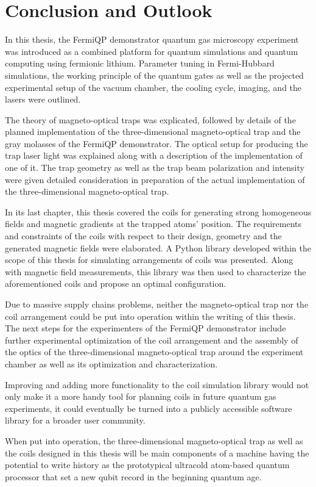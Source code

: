 \renewcommand{\imagepath}{../50-outro/img}

\chapter{Conclusion and Outlook}
In this thesis, the FermiQP demonstrator quantum gas microscopy experiment was introduced as a combined platform for quantum simulations and quantum computing using fermionic lithium. Parameter tuning in Fermi-Hubbard simulations, the working principle of the quantum gates as well as the projected experimental setup of the vacuum chamber, the cooling cycle, imaging, and the lasers were outlined.

The theory of magneto-optical traps was explicated, followed by details of the planned implementation of the three-dimensional magneto-optical trap and the gray molasses of the FermiQP demonstrator. The optical setup for producing the trap laser light was explained along with a description of the implementation of one of it. The trap geometry as well as the trap beam polarization and intensity were given detailed consideration in preparation of the actual implementation of the three-dimensional magneto-optical trap.

In its last chapter, this thesis covered the coils for generating strong homogeneous fields and magnetic gradients at the trapped atoms' position. The requirements and constraints of the coils with respect to their design, geometry and the generated magnetic fields were elaborated. A Python library developed within the scope of this thesis  for simulating arrangements of coils was presented. Along with magnetic field measurements, this library was then used to characterize the aforementioned coils and propose an optimal configuration.

Due to massive supply chains problems, neither the magneto-optical trap nor the coil arrangement could be put into operation within the writing of this thesis. The next steps for the experimenters of the FermiQP demonstrator include further experimental optimization of the coil arrangement and the assembly of the optics of the three-dimensional magneto-optical trap around the experiment chamber as well as its optimization and  characterization.

Improving and adding more functionality to the coil simulation library would not only make it a more handy tool for planning coils in future quantum gas experiments, it could eventually be turned into a publicly accessible software library for a broader user community.

When put into operation, the three-dimensional magneto-optical trap as well as the coils designed in this thesis will be main components of a machine having the potential to write history as the prototypical ultracold atom-based quantum processor that set a new qubit record in the beginning quantum age.
